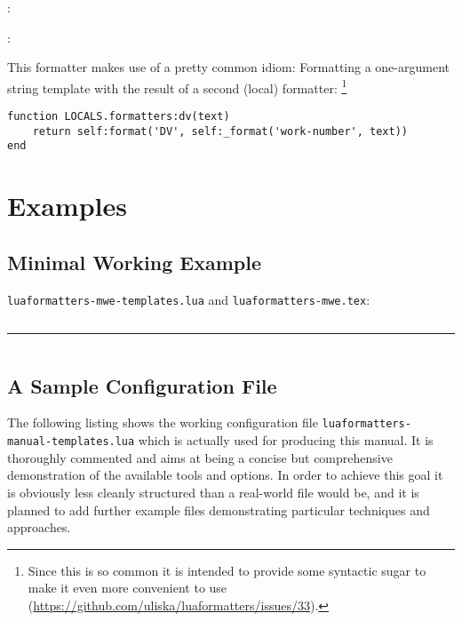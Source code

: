 \documentclass[12pt]{scrartcl}
\begin{document}
\begin{itemize*}
\item {}
\item {}
\item \texttt{}: 
\item \texttt{}: 
\end{itemize*}

\noindent This formatter makes use of a pretty common idiom: Formatting a one-argument string template with the result of a second (local) formatter:%
\footnote{Since this is so common it is intended to provide some syntactic sugar
to make it even more convenient to use
(\url{https://github.com/uliska/luaformatters/issues/33}).}

\begin{verbatim}
function LOCALS.formatters:dv(text)
    return self:format('DV', self:_format('work-number', text))
end
\end{verbatim}


\section{Examples}
\label{sec:examples}

\subsection{Minimal Working Example}
\label{sec:mwe}

\noindent
\texttt{luaformatters-mwe-templates.lua} and \texttt{luaformatters-mwe.tex}:

\inputminted{lua}{examples/luaformatters-mwe-templates.lua}

\hrule

\inputminted{tex}{examples/luaformatters-mwe.tex}





\subsection{A Sample Configuration File}
\label{sec:examples:manual-templates}

The following listing shows the working configuration file
\texttt{luaformatters-manual-templates.lua} which is actually used for producing
this manual. It is thoroughly commented and aims at being a concise but
comprehensive demonstration of the available tools and options.  In order to
achieve this goal it is obviously less cleanly structured than a real-world file
would be, and it is planned to add further example files demonstrating
particular techniques and approaches.
\end{document}
